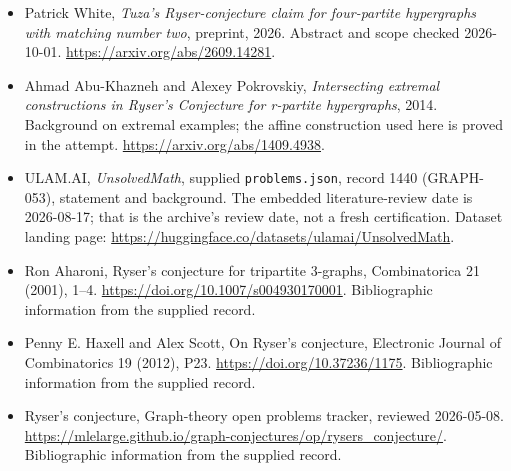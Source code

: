 \documentclass[11pt,a4paper]{article}
\begin{document}
{\small

\begin{itemize}
\item[Additional source A] Patrick White, \emph{Tuza's Ryser-conjecture claim for four-partite hypergraphs with matching number two}, preprint, 2026. Abstract and scope checked 2026-10-01. \url{https://arxiv.org/abs/2609.14281}.
\item[Additional source B] Ahmad Abu-Khazneh and Alexey Pokrovskiy, \emph{Intersecting extremal constructions in Ryser's Conjecture for r-partite hypergraphs}, 2014. Background on extremal examples; the affine construction used here is proved in the attempt. \url{https://arxiv.org/abs/1409.4938}.


\item[\hypertarget{source:1440:1}{S1}] ULAM.AI, \emph{UnsolvedMath}, supplied \texttt{problems.json}, record 1440 (GRAPH-053), statement and background. The embedded literature-review date is 2026-08-17; that is the archive’s review date, not a fresh certification. Dataset landing page: \url{https://huggingface.co/datasets/ulamai/UnsolvedMath}.

\item[\hypertarget{source:1440:2}{S2}] Ron Aharoni, Ryser's conjecture for tripartite 3-graphs, Combinatorica 21 (2001), 1–4. \url{https://doi.org/10.1007/s004930170001}. Bibliographic information from the supplied record.

\item[\hypertarget{source:1440:3}{S3}] Penny E. Haxell and Alex Scott, On Ryser's conjecture, Electronic Journal of Combinatorics 19 (2012), P23. \url{https://doi.org/10.37236/1175}. Bibliographic information from the supplied record.

\item[\hypertarget{source:1440:4}{S4}] Ryser's conjecture, Graph-theory open problems tracker, reviewed 2026-05-08. \url{https://mlelarge.github.io/graph-conjectures/op/rysers_conjecture/}. Bibliographic information from the supplied record.

\end{itemize}

}

\label{end:1440}
\end{document}

